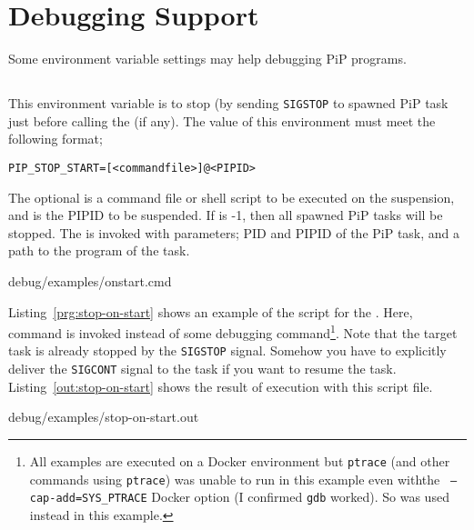 
\section{Debugging Support}

Some environment variable settings may help debugging PiP programs.

\subsection{}

This environment variable is to stop (by sending {\tt SIGSTOP} to
spawned PiP task just before calling the  (if
any). The value of this environment must meet the following format;

\begin{lstlisting}[frame=tb]
  PIP_STOP_START=[<commandfile>]@<PIPID>
\end{lstlisting}

The optional {\tt{}} is a command file or shell
script to be executed on the suspension, and {\tt{}} is the
PIPID to be suspended. If {\tt{}} is -1, then all spawned PiP
tasks will be stopped. The {\tt{}} is invoked with
parameters; PID and PIPID of the PiP task, and a path to the program
of the task.

 {debug/examples/onstart.cmd}

Listing~\ref{prg:stop-on-start} shows an example of the script for the
. Here,  command is invoked
instead of some debugging command\footnote{All examples are executed
on a Docker environment but {\tt ptrace} (and other commands using
{\tt ptrace}) was unable to run in this example even withthe {\tt
  --cap-add=SYS_PTRACE} Docker option (I confirmed {\tt gdb} worked). So 
 was used instead in this example.}. Note that 
the target task is already stopped by the {\tt SIGSTOP}
signal. Somehow you have to explicitly deliver the {\tt SIGCONT}
signal to the task if you want to resume the
task. Listing~\ref{out:stop-on-start} shows the result of 
 execution with this script file. 

 {debug/examples/stop-on-start.out}

